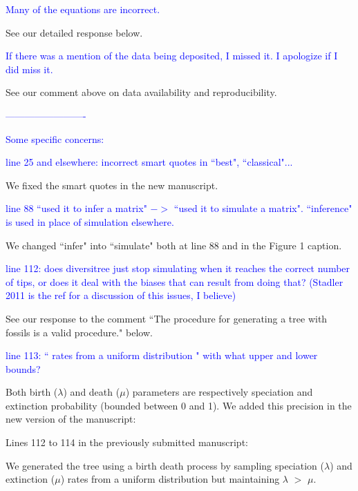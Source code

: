 \documentclass[11pt]{letter}
\begin{document}
\begin{letter}{}

\textcolor{blue}{Many of the equations are incorrect.}

See our detailed response below.


\textcolor{blue}{If there was a mention of the data being deposited, I missed it. I apologize if I did miss it.}

See our comment above on data availability and reproducibility.


\textcolor{blue}{-------------------------}

\textcolor{blue}{Some specific concerns:}


\textcolor{blue}{line 25 and elsewhere: incorrect smart quotes in ``best", ``classical"...}

We fixed the smart quotes in the new manuscript.


\textcolor{blue}{line 88 ``used it to infer a matrix" $->$ ``used it to simulate a matrix". ``inference" is used in place of simulation elsewhere.}

We changed ``infer" into ``simulate" both at line 88 and in the Figure 1 caption.


\textcolor{blue}{line 112: does diversitree just stop simulating when it reaches the correct number of tips, or does it deal with the biases that can result from doing that? (Stadler 2011 is the ref for a discussion of this issues, I believe)}

See our response to the comment ``The procedure for generating a tree with fossils is a valid procedure." below.


\textcolor{blue}{line 113: `` rates from a uniform distribution " with what upper and lower bounds?}

Both birth ($\lambda$) and death ($\mu$) parameters are respectively speciation and extinction probability (bounded between 0 and 1). We added this precision in the new version of the manuscript:

Lines 112 to 114 in the previously submitted manuscript:

\hfill\begin{minipage}{\dimexpr\textwidth-1cm}
We generated the tree using a birth death process by sampling speciation ($\lambda$) and extinction ($\mu$) rates from a uniform distribution but maintaining $\lambda$ $>$ $\mu$.
\end{minipage}


\end{letter}
\end{document}

